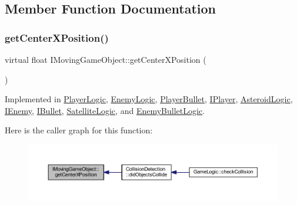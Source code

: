 \subsection{Member Function Documentation}
\mbox{\label{class_i_moving_game_object_ae4e6c21094ef1e2db32729270c8a7999}} 
\subsubsection{\texorpdfstring{get\+Center\+X\+Position()}{getCenterXPosition()}}
{\footnotesize\ttfamily virtual float I\+Moving\+Game\+Object\+::get\+Center\+X\+Position (\begin{DoxyParamCaption}{ }\end{DoxyParamCaption})\hspace{0.3cm}{\ttfamily [pure virtual]}}



Implemented in \hyperlink{class_player_logic_a6bdec8d007701c16a3cbb87e7fdfe0e6}{Player\+Logic}, \hyperlink{class_enemy_logic_a1429e91a81da7646d9b0280f26519d8c}{Enemy\+Logic}, \hyperlink{class_player_bullet_a73c27dca47ea3fdcecd82ce4b2089c4a}{Player\+Bullet}, \hyperlink{class_i_player_a10d652f5066f96f3526242448de3a6e2}{I\+Player}, \hyperlink{class_asteroid_logic_a4bff0373a2cefe48c984b469ddbcb52d}{Asteroid\+Logic}, \hyperlink{class_i_enemy_ab5bc39484a8aeaf278c3d127ec5d9545}{I\+Enemy}, \hyperlink{class_i_bullet_a43a43e2df81e05a03be42d9025e6dd2a}{I\+Bullet}, \hyperlink{class_satellite_logic_aa6e4c41fc34adaf4ef7861a6a3785226}{Satellite\+Logic}, and \hyperlink{class_enemy_bullet_logic_a39ffa8b7fabb84625a859691099652de}{Enemy\+Bullet\+Logic}.

Here is the caller graph for this function\+:\nopagebreak
\begin{figure}[H]
\begin{center}
\leavevmode
\includegraphics[width=350pt]{class_i_moving_game_object_ae4e6c21094ef1e2db32729270c8a7999_icgraph}
\end{center}
\end{figure}
\mbox{\label{class_i_moving_game_object_a075f69d69fd38dc02a0ec3c7b1cb0534}} 
